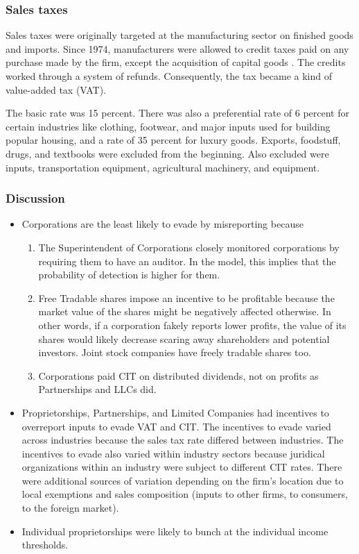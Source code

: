 \documentclass[
  12pt]{article}
\providecommand{\tightlist}{%
  \setlength{\itemsep}{0pt}\setlength{\parskip}{0pt}}\usepackage{longtable,booktabs,array}
\theoremstyle{definition}
\theoremstyle{remark}
\begin{document}
\subsubsection{Sales taxes}\label{sales-taxes}

Sales taxes were originally targeted at the manufacturing sector on
finished goods and imports. Since 1974, manufacturers were allowed to
credit taxes paid on any purchase made by the firm, except the
acquisition of capital goods \citep{Perry1990}. The credits worked
through a system of refunds. Consequently, the tax became a kind of
value-added tax (VAT).

The basic rate was 15 percent. There was also a preferential rate of 6
percent for certain industries like clothing, footwear, and major inputs
used for building popular housing, and a rate of 35 percent for luxury
goods. Exports, foodstuff, drugs, and textbooks were excluded from the
beginning. Also excluded were inputs, transportation equipment,
agricultural machinery, and equipment.

\subsubsection{Discussion}\label{discussion}

\begin{itemize}
\tightlist
\item
  Corporations are the least likely to evade by misreporting because

  \begin{enumerate}
  \def\labelenumi{\arabic{enumi}.}
  \tightlist
  \item
    The Superintendent of Corporations closely monitored corporations by
    requiring them to have an auditor. In the model, this implies that
    the probability of detection is higher for them.
  \item
    Free Tradable shares impose an incentive to be profitable because
    the market value of the shares might be negatively affected
    otherwise. In other words, if a corporation fakely reports lower
    profits, the value of its shares would likely decrease scaring away
    shareholders and potential investors. Joint stock companies have
    freely tradable shares too.
  \item
    Corporations paid CIT on distributed dividends, not on profits as
    Partnerships and LLCs did.
  \end{enumerate}
\item
  Proprietorships, Partnerships, and Limited Companies had incentives to
  overreport inputs to evade VAT and CIT. The incentives to evade varied
  across industries because the sales tax rate differed between
  industries. The incentives to evade also varied within industry
  sectors because juridical organizations within an industry were
  subject to different CIT rates. There were additional sources of
  variation depending on the firm's location due to local exemptions and
  sales composition (inputs to other firms, to consumers, to the foreign
  market).
\item
  Individual proprietorships were likely to bunch at the individual
  income thresholds.
\end{itemize}
\end{document}
